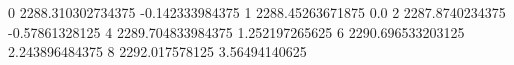 0 2288.310302734375 -0.142333984375
1 2288.45263671875 0.0
2 2287.8740234375 -0.57861328125
4 2289.704833984375 1.252197265625
6 2290.696533203125 2.243896484375
8 2292.017578125 3.56494140625
